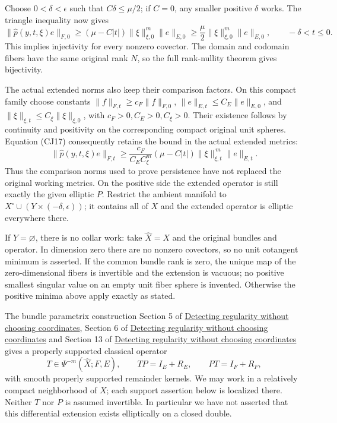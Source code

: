 \documentclass[
  11pt,
]{article}
\begin{document}
Choose \(0<\delta<\epsilon\) such that \(C\delta\leq\mu/2\); if \(C=0\),
any smaller positive \(\delta\) works. The triangle inequality now gives
\[
 \|\widehat p(y,t,\xi)e\|_{F,0}
 \geq(\mu-C|t|)\|\xi\|_{\xi,0}^m\|e\|_{E,0}
 \geq\frac\mu2\|\xi\|_{\xi,0}^m\|e\|_{E,0},
 \qquad -\delta<t\leq0.
 \tag{CJ17}
\] This implies injectivity for every nonzero covector. The domain and
codomain fibers have the same original rank \(N\), so the full
rank-nullity theorem gives bijectivity.

The actual extended norms also keep their comparison factors. On this
compact family choose constants \(\|f\|_{F,t}\geq c_F\|f\|_{F,0}\),
\(\|e\|_{E,t}\leq C_E\|e\|_{E,0}\), and
\(\|\xi\|_{\xi,t}\leq C_\xi\|\xi\|_{\xi,0}\), with
\(c_F>0,C_E>0,C_\xi>0\). Their existence follows by continuity and
positivity on the corresponding compact original unit spheres. Equation
(CJ17) consequently retains the bound in the actual extended metrics: \[
 \|\widehat p(y,t,\xi)e\|_{F,t}
 \geq\frac{c_F}{C_EC_\xi^m}
        (\mu-C|t|)\|\xi\|_{\xi,t}^{\,m}\|e\|_{E,t}.
 \tag{CJ18}
\] Thus the comparison norms used to prove persistence have not replaced
the original working metrics. On the positive side the extended operator
is still exactly the given elliptic \(P\). Restrict the ambient manifold
to \(X^\circ\cup(Y\times(-\delta,\epsilon))\); it contains all of \(X\)
and the extended operator is elliptic everywhere there.

If \(Y=\varnothing\), there is no collar work: take \(\widehat X=X\) and
the original bundles and operator. In dimension zero there are no
nonzero covectors, so no unit cotangent minimum is asserted. If the
common bundle rank is zero, the unique map of the zero-dimensional
fibers is invertible and the extension is vacuous; no positive smallest
singular value on an empty unit fiber sphere is invented. Otherwise the
positive minima above apply exactly as stated.

The bundle parametrix construction Section 5 of
\href{geometric-microlocal-calculus.pdf}{Detecting regularity without
choosing coordinates}, Section 6 of
\href{geometric-microlocal-calculus.pdf}{Detecting regularity without
choosing coordinates} and Section 13 of
\href{geometric-microlocal-calculus.pdf}{Detecting regularity without
choosing coordinates} gives a properly supported classical operator \[
T\in\Psi^{-m}(\widehat X;F,E),\qquad
TP=I_E+R_E,\qquad PT=I_F+R_F,
\tag{CD10}
\] with smooth properly supported remainder kernels. We may work in a
relatively compact neighborhood of \(X\); each support assertion below
is localized there. Neither \(T\) nor \(P\) is assumed invertible. In
particular we have not asserted that this differential extension exists
elliptically on a closed double.
\end{document}
